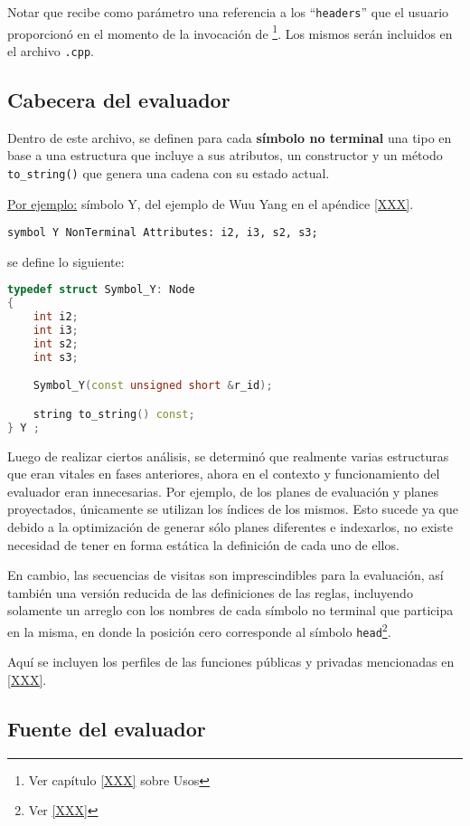 Notar que recibe como parámetro una referencia a los ``\texttt{headers}'' que el usuario proporcionó en el momento de la invocación de \maggen \footnote{Ver capítulo \ref{XXX} sobre Usos}. Los mismos serán incluidos en el archivo \texttt{.cpp}.

\subsection{Cabecera del evaluador}

Dentro de este archivo, se definen para cada \textbf{símbolo no terminal} una tipo en base a una estructura que incluye a sus atributos, un constructor y un método \texttt{to\_string()} que genera una cadena con su estado actual.

\underline{Por ejemplo:} símbolo Y, del ejemplo de Wuu Yang en el apéndice \ref{XXX}.
\begin{center}\texttt{symbol Y  NonTerminal Attributes: i2, i3, s2, s3;}\end{center}
se define lo siguiente:
\begin{lstlisting}[language=C++, basicstyle=\scriptsize, columns=fullflexible, linewidth=7cm]
typedef struct Symbol_Y: Node
{
    int i2;
    int i3;
    int s2;
    int s3;

    Symbol_Y(const unsigned short &r_id);

    string to_string() const;
} Y ;
\end{lstlisting}

Luego de realizar ciertos análisis, se determinó que realmente varias estructuras que eran vitales en fases anteriores, ahora en el contexto y funcionamiento del evaluador eran innecesarias. Por ejemplo, de los planes de evaluación y planes proyectados, únicamente se utilizan los índices de los mismos. Esto sucede ya que debido a la optimización de generar sólo planes diferentes e indexarlos, no existe necesidad de tener en forma estática la definición de cada uno de ellos.

En cambio, las secuencias de visitas son imprescindibles para la evaluación, así también una versión reducida de las definiciones de las reglas, incluyendo solamente un arreglo con los nombres de cada símbolo no terminal que participa en la misma, en donde la posición cero corresponde al símbolo \texttt{head}\footnote{Ver \ref{XXX}}.

Aquí se incluyen los perfiles de las funciones públicas y privadas mencionadas en \ref{XXX}.

\subsection{Fuente del evaluador}


